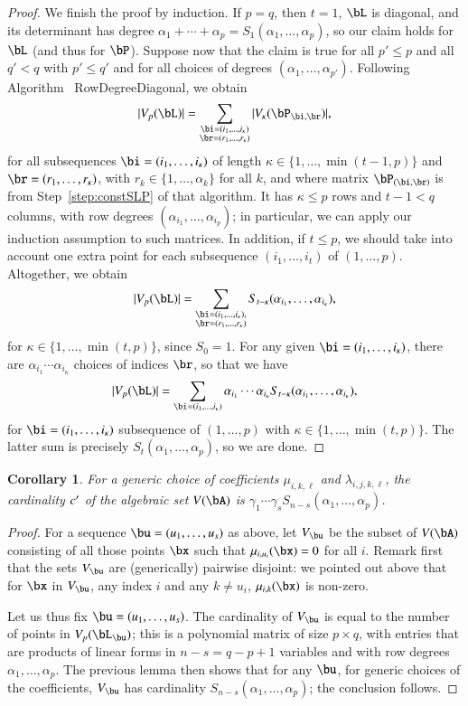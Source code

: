 \documentclass[amsthm]{elsart}
\newtheorem{corollary}[definition]{Corollary}
\begin{document}
\begin{proof}
  We finish the proof by induction. If $p=q$, then $t=1$, $\bL$ is
  diagonal, and its determinant has degree $\alpha_1 + \cdots +
  \alpha_p = S_1(\alpha_1,\dots,\alpha_p)$, so our claim holds for
  $\bL$ (and thus for $\bP$). Suppose now that the claim is true for
  all $p'\le p$ and all $q' < q$ with $p' \le q'$ and for all choices
  of degrees $(\alpha_1,\dots,\alpha_{p'})$. Following Algorithm~{\sf
    RowDegreeDiagonal}, we obtain
  $$
  |V_p(\bL)| = \sum_{\substack{\bi=(i_1,\dots,i_\kappa)\\\br=(r_1,\dots,r_\kappa)}}  |V_\kappa(\bP_{\bi,\br})|,
  $$ for all subsequences $\bi=(i_1,\dots,i_\kappa)$ of length $\kappa
  \in \{1,\dots,\min(t-1,p)\}$ and $\br=(r_1,\dots,r_\kappa)$, with
  $r_k \in \{1,\dots,\alpha_k\}$ for all $k$, and where matrix
  $\bP_{(\bi,\br)}$ is from Step~\ref{step:constSLP} of that algorithm.
  It has $\kappa \le p$ rows and $t-1 < q$ columns, with row degrees
  $(\alpha_{i_1},\dots,\alpha_{i_p})$; in particular, we can apply our
  induction assumption to such matrices.  In addition, if $t \le p$,
  we should take into account one extra point for each subsequence
  $(i_1,\dots,i_t)$ of $(1,\dots,p)$. Altogether, we obtain
  $$
  |V_p(\bL)| = \sum_{\substack{\bi=(i_1,\dots,i_\kappa),\\\br=(r_1,\dots,r_\kappa)}}  S_{t-\kappa}(\alpha_{i_1},\dots,\alpha_{i_\kappa}),
  $$
  for $\kappa \in \{1,\dots,\min(t,p)\}$, since $S_0=1$.
  For any given $\bi=(i_1,\dots,i_\kappa)$, there are $\alpha_{i_1}\cdots \alpha_{i_\kappa}$ 
  choices of indices $\br$, so that we have
  $$
  |V_p(\bL)| = \sum_{\bi=(i_1,\dots,i_\kappa)} \alpha_{i_1}\cdots \alpha_{i_\kappa} S_{t-\kappa}(\alpha_{i_1},\dots,\alpha_{i_\kappa}),
  $$
  for $\bi=(i_1,\dots,i_\kappa)$ subsequence of $(1,\dots,p)$ with $\kappa \in \{1,\dots,\min(t,p)\}$.
  The latter sum is precisely $S_t(\alpha_1,\dots,\alpha_p)$, so we are done.
\end{proof}

\begin{corollary}\label{coro:complete}
  For a generic choice of coefficients $\mu_{i,k,\ell}$ and
  $\lambda_{i,j,k,\ell}$, the cardinality ${c'}{}$ of the algebraic set
  $V(\bA)$ is $\gamma_1 \cdots \gamma_s S_{n-s}(\alpha_1,\dots,\alpha_p)$.
\end{corollary}
\begin{proof}
  For a sequence $\bu=(u_1,\dots,u_s)$ as above, let $V_\bu$ be the
  subset of $V(\bA)$ consisting of all those points $\bx$ such that
  $\mu_{i,u_i}(\bx)=0$ for all $i$. Remark first that the sets $V_\bu$
  are (generically) pairwise disjoint: we pointed out above that for
  $\bx$ in $V_\bu$, any index $i$ and any $k \ne u_i$,
  $\mu_{i,k}(\bx)$ is non-zero.
  
  Let us thus fix $\bu=(u_1,\dots,u_s)$. The cardinality of $V_\bu$ is
  equal to the number of points in $V_p(\bL_\bu)$; this is a
  polynomial matrix of size $p \times q$, with entries that are
  products of linear forms in $n-s=q-p+1$ variables and with row
  degrees $\alpha_1,\dots,\alpha_p$. The previous lemma then shows
  that for any $\bu$, for generic choices of the coefficients, $V_\bu$
  has cardinality $S_{n-s}(\alpha_1,\dots,\alpha_p)$; the conclusion
  follows.
\end{proof}
\end{document}
